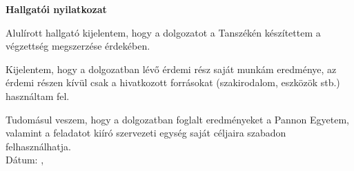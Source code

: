 \begin{center}
\textbf{\large{Hallgatói nyilatkozat}}\\[32pt]
\end{center}

\thispagestyle{fancy}
\pagestyle{fancy}
Alulírott \mynev hallgató kijelentem, hogy a dolgozatot a \myuni \mytanszek Tanszékén készítettem a \myvegzettseg végzettség megszerzése érdekében.\par

Kijelentem, hogy a dolgozatban lévő érdemi rész saját munkám eredménye, az érdemi részen kívül csak a hivatkozott forrásokat (szakirodalom, eszközök stb.) használtam fel.\par

Tudomásul veszem, hogy a dolgozatban foglalt eredményeket a Pannon Egyetem, valamint a feladatot kiíró szervezeti egység saját céljaira szabadon felhasználhatja.\\


\vspace{2cm}
Dátum: \myvaros, \mydate\\
\vspace{2cm}

\SignatureAndDate{\mynev}
